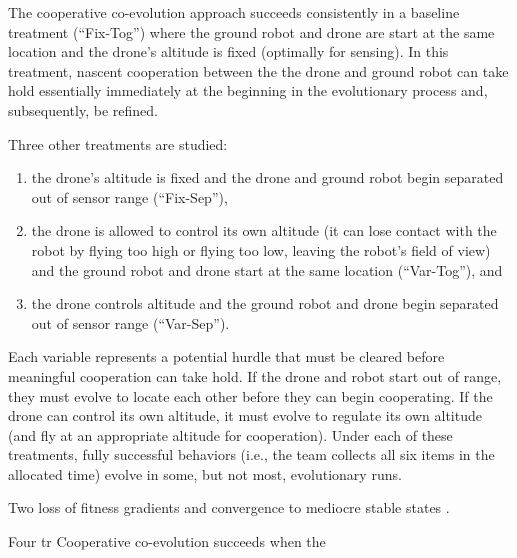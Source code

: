 The cooperative co-evolution approach succeeds consistently in a baseline treatment (``Fix-Tog'') where the ground robot and drone are start at the same location and the drone's altitude is fixed (optimally for sensing).
In this treatment, nascent cooperation between the the drone and ground robot can take hold essentially immediately at the beginning in the evolutionary process and, subsequently, be refined.

Three other treatments are studied:
\begin{enumerate}
\item the drone's altitude is fixed and the drone and ground robot begin separated out of sensor range (``Fix-Sep''),
\item the drone is allowed to control its own altitude (it can lose contact with the robot by flying too high or flying too low, leaving the robot's field of view) and the ground robot and drone start at the same location (``Var-Tog''), and
\item the drone controls altitude and the ground robot and drone begin separated out of sensor range (``Var-Sep'').
\end{enumerate}
Each variable represents a potential hurdle that must be cleared before meaningful cooperation can take hold.
If the drone and robot start out of range, they must evolve to locate each other before they can begin cooperating.
If the drone can control its own altitude, it must evolve to regulate its own altitude (and fly at an appropriate altitude for cooperation).
Under each of these treatments, fully successful behaviors (i.e., the team collects all six items in the allocated time) evolve in some, but not most, evolutionary runs.


Two loss of fitness gradients \cite{wiegand2003analysis} and convergence to mediocre stable states \cite{panait2010theoretical}.

Four tr
Cooperative co-evolution succeeds when the
